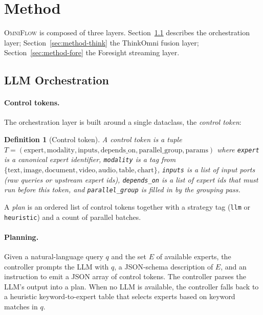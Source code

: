 \documentclass[11pt,a4paper]{article}
\newtheorem{definition}{Definition}
\newcommand{\OmniFlow}{\textsc{OmniFlow}}
\begin{document}
\section{Method}\label{sec:method}

\OmniFlow{} is composed of three layers. Section~\ref{sec:method-orch}
describes the orchestration layer; Section~\ref{sec:method-think} the
ThinkOmni fusion layer; Section~\ref{sec:method-fore} the Foresight
streaming layer.

\subsection{LLM Orchestration}\label{sec:method-orch}

\paragraph{Control tokens.}
The orchestration layer is built around a single dataclass, the
\emph{control token}:

\begin{definition}[Control token]\label{def:control-token}
A control token is a tuple
$T = (\text{expert}, \text{modality}, \text{inputs}, \text{depends\_on},
\text{parallel\_group}, \text{params})$ where \texttt{expert} is a
canonical expert identifier, \texttt{modality} is a tag from
$\{\text{text}, \text{image}, \text{document}, \text{video}, \text{audio},
\text{table}, \text{chart}\}$, \texttt{inputs} is a list of input ports
(raw queries or upstream expert ids), \texttt{depends\_on} is a list of
expert ids that must run before this token, and \texttt{parallel\_group}
is filled in by the grouping pass.
\end{definition}

A \emph{plan} is an ordered list of control tokens together with a
strategy tag (\texttt{llm} or \texttt{heuristic}) and a count of parallel
batches.

\paragraph{Planning.}
Given a natural-language query $q$ and the set $E$ of available experts,
the controller prompts the LLM with $q$, a JSON-schema description of
$E$, and an instruction to emit a JSON array of control tokens. The
controller parses the LLM's output into a plan. When no LLM is
available, the controller falls back to a heuristic keyword-to-expert
table that selects experts based on keyword matches in $q$.
\end{document}
